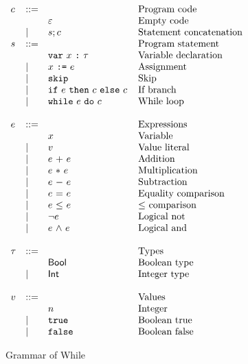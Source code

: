 \begin{figure}[]
  \centering
  $\begin{array}{lll@{\hspace{4mm}}l}
    c &::= &  & \mbox{Program code} \\
    &  & \varepsilon & \mbox{Empty code} \\
    &| & s; c & \mbox{Statement concatenation} \\
    s &::= & & \mbox{Program statement} \\
    &  & \WhDecl{x}{\tau} & \mbox{Variable declaration} \\
    &| & \WhAssign{x}{e} & \mbox{Assignment} \\
    &| & \WhSkip & \mbox{Skip} \\
    &| & \WhIf{e}{c}{c} & \mbox{If branch} \\
    &| & \WhWhile{e}{c} & \mbox{While loop} \\
    &&&\\
    e & ::= & & \mbox{Expressions} \\
    & & x & \mbox{Variable} \\
    &| & v & \mbox{Value literal} \\
    &| & \WhAdd{e}{e} & \mbox{Addition} \\
    &| & \WhTimes{e}{e} & \mbox{Multiplication} \\
    &| & \WhMinus{e}{e} & \mbox{Subtraction} \\
    &| & \WhEq{e}{e} & \mbox{Equality comparison} \\
    &| & \WhLeq{e}{e} & \mbox{$\leq$ comparison} \\
    &| & \WhLnot{e} & \mbox{Logical not} \\
    &| & \WhLand{e}{e} & \mbox{Logical and} \\
    &&&\\
    \tau & ::= & & \mbox{Types} \\
    & & \WhBool & \mbox{Boolean type} \\
    &| & \WhInt & \mbox{Integer type} \\
    &&&\\
    v & ::= & & \mbox{Values} \\
    &  & n & \mbox{Integer} \\
    &| & \WhTrue & \mbox{Boolean true} \\
    &| & \WhFalse & \mbox{Boolean false} \\
  \end{array}$
  \caption{Grammar of While}
  \label{fig:while_grammar}
\end{figure}

